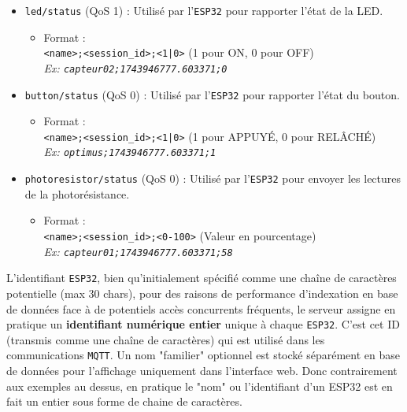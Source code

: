 \documentclass[12pt]{article}
\begin{document}
\begin{itemize}
    \item \texttt{led/status} (QoS 1) : Utilisé par l'\texttt{ESP32} pour rapporter l'état de la LED.
    \begin{itemize}
        \item Format : \\
        \texttt{<name>;<session\_id>;<1|0>} (1 pour ON, 0 pour OFF) \\
        \textit{Ex: \texttt{capteur02;1743946777.603371;0}}
    \end{itemize}

    \item \texttt{button/status} (QoS 0) : Utilisé par l'\texttt{ESP32} pour rapporter l'état du bouton.
    \begin{itemize}
        \item Format : \\
        \texttt{<name>;<session\_id>;<1|0>} (1 pour APPUYÉ, 0 pour RELÂCHÉ) \\
        \textit{Ex: \texttt{optimus;1743946777.603371;1}}
    \end{itemize}

    \item \texttt{photoresistor/status} (QoS 0) : Utilisé par l'\texttt{ESP32} pour envoyer les lectures de la photorésistance.
    \begin{itemize}
        \item Format : \\
        \texttt{<name>;<session\_id>;<0-100>} (Valeur en pourcentage) \\
        \textit{Ex: \texttt{capteur01;1743946777.603371;58}}
    \end{itemize}
\end{itemize}

L'identifiant \texttt{ESP32}, bien qu'initialement spécifié comme une chaîne de caractères potentielle (max 30 chars), pour des raisons de performance d'indexation en base de données face à de potentiels accès concurrents fréquents, le serveur assigne en pratique un \textbf{identifiant numérique entier} unique à chaque \texttt{ESP32}. C'est cet ID (transmis comme une chaîne de caractères) qui est utilisé dans les communications \texttt{MQTT}. Un nom "familier" optionnel est stocké séparément en base de données pour l'affichage uniquement dans l'interface web. Donc contrairement aux exemples au dessus, en pratique le "nom" ou l'identifiant d'un ESP32 est en fait un entier sous forme de chaine de caractères.
\end{document}
